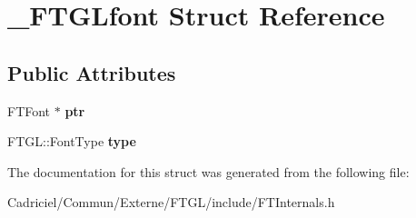 \hypertarget{struct___f_t_g_lfont}{}\section{\+\_\+\+F\+T\+G\+Lfont Struct Reference}
\label{struct___f_t_g_lfont}
\subsection*{Public Attributes}
\begin{DoxyCompactItemize}
\item 
F\+T\+Font $\ast$ {\bfseries ptr}\hypertarget{struct___f_t_g_lfont_a8bc834719ce209cd1ecc385b75e363b2}{}\label{struct___f_t_g_lfont_a8bc834719ce209cd1ecc385b75e363b2}

\item 
F\+T\+G\+L\+::\+Font\+Type {\bfseries type}\hypertarget{struct___f_t_g_lfont_a1809096d837d4099e0470aa83a061ada}{}\label{struct___f_t_g_lfont_a1809096d837d4099e0470aa83a061ada}

\end{DoxyCompactItemize}


The documentation for this struct was generated from the following file\+:\begin{DoxyCompactItemize}
\item 
Cadriciel/\+Commun/\+Externe/\+F\+T\+G\+L/include/F\+T\+Internals.\+h\end{DoxyCompactItemize}
